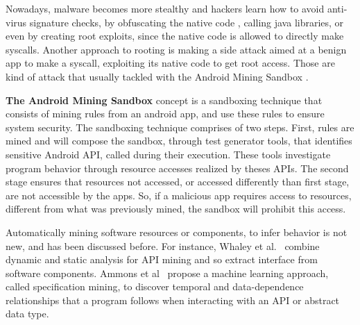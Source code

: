 Nowadays, malware becomes more stealthy and hackers learn how to avoid anti-virus signature checks, by obfuscating the native code , calling java libraries, or even by creating root exploits, since the native code is allowed to directly make syscalls. Another approach to rooting is making a side attack aimed at a benign app to make a syscall, exploiting its native code to get root access. Those are kind of attack that usually tackled with the Android Mining Sandbox \cite{DBLP:conf/icse/JamrozikSZ16}.


\textbf{The Android Mining Sandbox} concept is a sandboxing technique that consists of mining rules from an android app, and use these rules to ensure system security. The sandboxing technique comprises of two steps. First, rules are mined and will compose the sandbox,
through test generator tools, that identifies sensitive Android API, called during their execution. 
These tools investigate program behavior through resource accesses realized by theses APIs. The second stage ensures that resources not accessed, or accessed differently than first stage, are not accessible by the apps. So, if a malicious app requires access to resources, different from what was previously mined, the sandbox will prohibit this access.

Automatically mining software resources or components, to infer behavior is not new, and has been discussed before. For instance, Whaley et al.~\cite{DBLP:conf/issta/WhaleyML02} combine dynamic and static analysis for API mining and so extract interface from software components. Ammons et al~\cite{DBLP:conf/popl/AmmonsBL02} propose a machine learning
approach, called specification mining, to discover temporal and data-dependence relationships that a program follows when interacting with an API or abstract data type.

